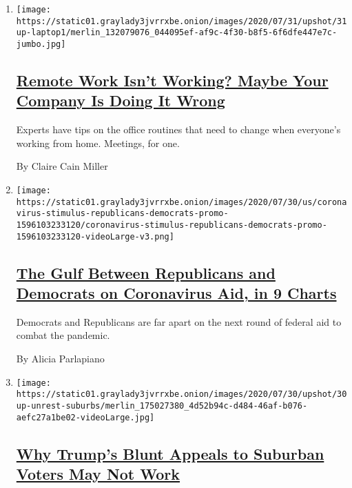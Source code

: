 \begin{enumerate}
\def\labelenumi{\arabic{enumi}.}
\item
  \texttt{[image: https://static01.graylady3jvrrxbe.onion/images/2020/07/31/upshot/31up-laptop1/merlin\_132079076\_044095ef-af9c-4f30-b8f5-6f6dfe447e7c-jumbo.jpg]}

  \hypertarget{remote-work-isnt-working-maybe-your-company-is-doing-it-wrong}{%
  \subsection{\texorpdfstring{\href{/2020/07/31/upshot/remote-work-tips.html}{Remote
  Work Isn't Working? Maybe Your Company Is Doing It
  Wrong}}{Remote Work Isn't Working? Maybe Your Company Is Doing It Wrong}}\label{remote-work-isnt-working-maybe-your-company-is-doing-it-wrong}}

  Experts have tips on the office routines that need to change when
  everyone's working from home. Meetings, for one.

  By Claire Cain Miller
\item
  \texttt{[image: https://static01.graylady3jvrrxbe.onion/images/2020/07/30/us/coronavirus-stimulus-republicans-democrats-promo-1596103233120/coronavirus-stimulus-republicans-democrats-promo-1596103233120-videoLarge-v3.png]}

  \hypertarget{the-gulf-between-republicans-and-democrats-on-coronavirus-aid-in-9-charts}{%
  \subsection{\texorpdfstring{\href{/interactive/2020/07/30/upshot/coronavirus-stimulus-bill.html}{The
  Gulf Between Republicans and Democrats on Coronavirus Aid, in 9
  Charts}}{The Gulf Between Republicans and Democrats on Coronavirus Aid, in 9 Charts}}\label{the-gulf-between-republicans-and-democrats-on-coronavirus-aid-in-9-charts}}

  Democrats and Republicans are far apart on the next round of federal
  aid to combat the pandemic.

  By Alicia Parlapiano
\item
  \texttt{[image: https://static01.graylady3jvrrxbe.onion/images/2020/07/30/upshot/30up-unrest-suburbs/merlin\_175027380\_4d52b94c-d484-46af-b076-aefc27a1be02-videoLarge.jpg]}

  \hypertarget{why-trumps-blunt-appeals-to-suburban-voters-may-not-work}{%
  \subsection{\texorpdfstring{\href{/2020/07/30/upshot/trump-suburban-voters.html}{Why
  Trump's Blunt Appeals to Suburban Voters May Not
  Work}}{Why Trump's Blunt Appeals to Suburban Voters May Not Work}}\label{why-trumps-blunt-appeals-to-suburban-voters-may-not-work}}


\end{enumerate}
